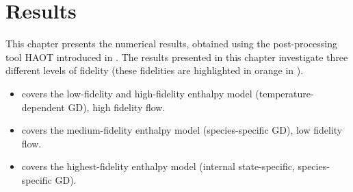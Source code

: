 \chapter{Results\label{ch:ch4}}
This chapter presents the numerical results, obtained using the post-processing
tool \gls{HAOT} introduced in .  The results presented in this chapter investigate three different levels of
fidelity (these fidelities are highlighted in orange in ).
\begin{itemize}
    \item {} covers the low-fidelity and high-fidelity enthalpy model
        (temperature-dependent \gls{GD}), high fidelity flow.
    \item {} covers the medium-fidelity enthalpy model
        (species-specific \gls{GD}), low fidelity flow.
    \item {} covers the highest-fidelity enthalpy model (internal state-specific, species-specific \gls{GD}).
\end{itemize}

